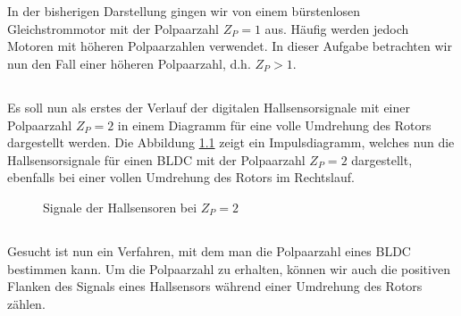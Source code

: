 \chapter{}\label{ch:auf3}
In der bisherigen Darstellung gingen wir von einem bürstenlosen Gleichstrommotor mit der Polpaarzahl $ Z_{P} = 1 $ aus. Häufig werden jedoch Motoren mit höheren Polpaarzahlen verwendet. In dieser Aufgabe betrachten wir nun den Fall einer höheren Polpaarzahl, d.h. $ Z_{P} > 1$.

\section{}\label{sec:3a}
Es soll nun als erstes der Verlauf der digitalen Hallsensorsignale mit einer Polpaarzahl $ Z_{P} = 2 $ in einem Diagramm für eine volle Umdrehung des Rotors dargestellt werden.
Die Abbildung \ref{fig:3a:hall} zeigt ein Impulsdiagramm, welches nun die Hallsensorsignale für einen BLDC mit der Polpaarzahl $ Z_{P} = 2 $ dargestellt, ebenfalls bei einer vollen Umdrehung des Rotors im Rechtslauf.
\begin{figure}[h]
	\centering
	
	\label{fig:3a:hall}
	\caption{Signale der Hallsensoren bei $ Z_{P} = 2 $}
\end{figure}

\section{}\label{sec:3b}
Gesucht ist nun ein Verfahren, mit dem man die Polpaarzahl eines BLDC bestimmen kann. Um die Polpaarzahl zu erhalten, können wir auch die positiven Flanken des Signals eines Hallsensors während einer Umdrehung des Rotors zählen.

